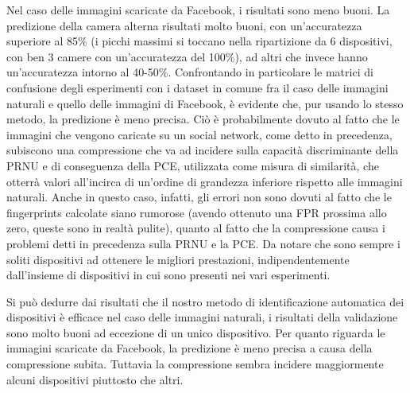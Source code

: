 Nel caso delle immagini scaricate da Facebook, i risultati sono meno buoni. La predizione della camera alterna risultati molto buoni, con un'accuratezza superiore al 85\% (i picchi massimi si toccano nella ripartizione da 6 dispositivi, con ben 3 camere con un'accuratezza del 100\%), ad altri che invece hanno un'accuratezza intorno al 40-50\%. Confrontando in particolare le matrici di confusione degli esperimenti con i dataset in comune fra il caso delle immagini naturali e quello delle immagini di Facebook, è evidente che, pur usando lo stesso metodo, la predizione è meno precisa. Ciò è probabilmente dovuto al fatto che le immagini che vengono caricate su un social network, come detto in precedenza, subiscono una compressione che va ad incidere sulla capacità discriminante della PRNU e di conseguenza della PCE, utilizzata come misura di similarità, che otterrà valori all'incirca di un'ordine di grandezza inferiore rispetto alle immagini naturali. 
Anche in questo caso, infatti, gli errori non sono dovuti al fatto che le fingerprints calcolate siano rumorose (avendo ottenuto una FPR prossima allo zero, queste sono in realtà pulite), quanto al fatto che la compressione causa i problemi detti in precedenza sulla PRNU e la PCE.
Da notare che sono sempre i soliti dispositivi ad ottenere le migliori prestazioni, indipendentemente dall'insieme di dispositivi in cui sono presenti nei vari esperimenti.

Si può dedurre dai risultati che il nostro metodo di identificazione automatica dei dispositivi è efficace nel caso delle immagini naturali, i risultati della validazione sono molto buoni ad eccezione di un unico dispositivo. Per quanto riguarda le immagini scaricate da Facebook, la predizione è meno precisa a causa della compressione subita. Tuttavia la compressione sembra incidere maggiormente alcuni dispositivi piuttosto che altri.